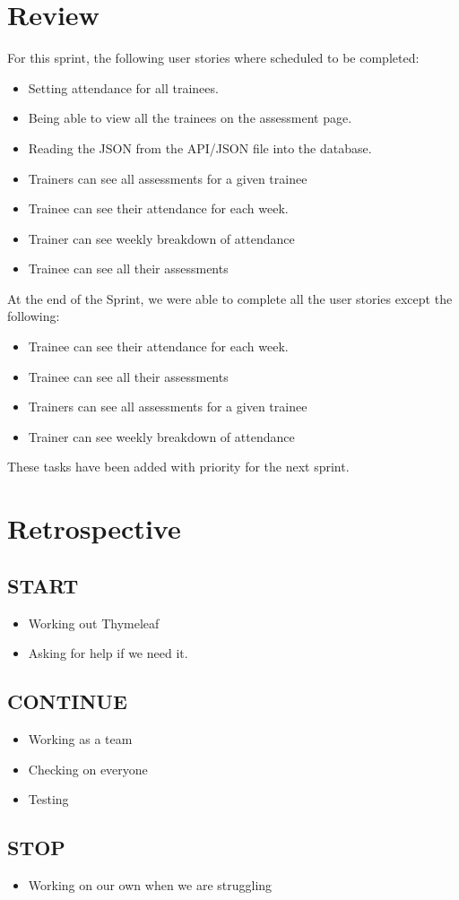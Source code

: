 \documentclass[]{report}
\begin{document}
		\section*{Review}
			For this sprint, the following user stories where scheduled to be completed:
			\begin{itemize}
				\item Setting attendance for all trainees.
				\item Being able to view all the trainees on the assessment page.
				\item Reading the JSON from the API/JSON file into the database.
				\item Trainers can see all assessments for a given trainee
				\item Trainee can see their attendance for each week.
				\item Trainer can see weekly breakdown of attendance
				\item Trainee can see all their assessments
			\end{itemize}
			At the end of the Sprint, we were able to complete all the user stories except the following:
			\begin{itemize}
				\item Trainee can see their attendance for each week.
				\item Trainee can see all their assessments
				\item Trainers can see all assessments for a given trainee
				\item Trainer can see weekly breakdown of attendance
			\end{itemize}
			These tasks have been added with priority for the next sprint.
		\section*{Retrospective}
			\subsection*{START}
				\begin{itemize}
					\item Working out Thymeleaf
					\item Asking for help if we need it.
				\end{itemize}
			\subsection*{CONTINUE}
				\begin{itemize}
					\item Working as a team
					\item Checking on everyone
					\item Testing
				\end{itemize}
			\subsection*{STOP}
				\begin{itemize}
					\item Working on our own when we are struggling
				\end{itemize}
\end{document}
